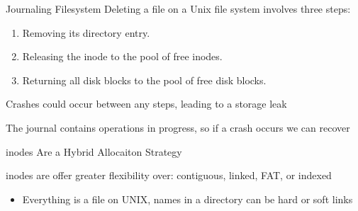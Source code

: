   \begin{frame}{Journaling Filesystem}
    Deleting a file on a Unix file system involves three steps:

    \begin{enumerate}
      \item Removing its directory entry.
      \item Releasing the inode to the pool of free inodes.
      \item Returning all disk blocks to the pool of free disk blocks.
    \end{enumerate}

    \vspace{2em}

    Crashes could occur between any steps, leading to a storage leak

    \vspace{2em}

    The journal contains operations in progress, so if a crash occurs we can recover
  \end{frame}

  \begin{frame}{inodes Are a Hybrid Allocaiton Strategy}
    
    inodes are offer greater flexibility over: contiguous, linked, FAT, or
    indexed

    \begin{itemize}
      \item Everything is a file on UNIX, names in a directory can be hard or
            soft links
    \end{itemize}
  \end{frame}

